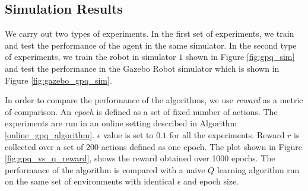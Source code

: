 \documentclass[12pt]{report}
\begin{document}
\subsection{Simulation Results}
We carry out two types of experiments. In the first set of experiments, we train and test the performance of the agent in the same simulator. In the second type of experiments, we train the robot in  simulator $1$ shown in Figure \ref{fig:gpq_sim} and test the performance in the Gazebo Robot simulator which is shown in Figure \ref{fig:gazebo_gpq_sim}.\par 

In order to compare the performance of the algorithms, we use \textit{reward} as a metric of comparison. An \textit{epoch} is defined as a set of fixed number of actions. The experiments are run in an online setting described in Algorithm \ref{online_gpq_algorithm}. $\epsilon$ value is set to $0.1$ for all the experiments. Reward $r$ is collected over a set of $200$ actions defined as one epoch. The plot shown in Figure \ref{fig:gpq_vs_q_reward}, shows the reward obtained over 1000 epochs. The performance of the algorithm is compared with a naive $Q$ learning algorithm run on the same set of environments with identical $\epsilon$ and epoch size.
\end{document}
